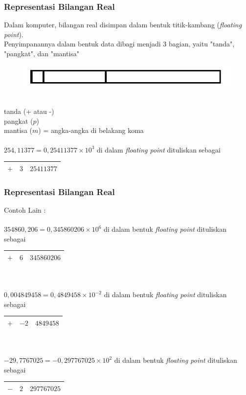 \documentclass{beamer}
\begin{document}
\begin{frame}
\frametitle{Representasi Bilangan Real}
Dalam komputer, bilangan real disimpan dalam bentuk titik-kambang (\textit{floating point}). 
\\Penyimpanannya dalam bentuk data dibagi menjadi 3 bagian, yaitu "tanda", "pangkat", dan "mantisa"
\begin{figure}[htp]
\centering
\includegraphics[scale=0.50]{float.jpg}
\end{figure}
\ \\tanda (+ atau -)
\\pangkat ($p$)
\\mantisa ($m$) = angka-angka di belakang koma 
\\\ \\$254,11377 = 0,25411377 \times 10^3$ di dalam \textit{floating point} dituliskan sebagai 
\begin{center}
\begin{tabular}{|c|c|c|}
\hline
	$+$ & $3$ & $25411377$\\
\hline
\end{tabular}
\end{center}
\end{frame}

\begin{frame}
\frametitle{Representasi Bilangan Real}
Contoh Lain :
\\\ \\$354860,206 = 0,345860206 \times 10^6$ di dalam bentuk \textit{floating point} dituliskan sebagai 
\begin{center}
\begin{tabular}{|c|c|c|}
\hline
	$+$ & $6$ & $345860206$\\
\hline
\end{tabular}
\end{center}
\ \\\ \\$0,004849458 = 0,4849458 \times 10^{-2}$ di dalam bentuk \textit{floating point} dituliskan sebagai 
\begin{center}
\begin{tabular}{|c|c|c|}
\hline
	$+$ & $-2$ & $4849458$\\
\hline
\end{tabular}
\end{center}
\ \\\ \\$-29,7767025 = -0,297767025 \times 10^{2}$ di dalam bentuk \textit{floating point} dituliskan sebagai 
\begin{center}
\begin{tabular}{|c|c|c|}
\hline
	$-$ & $2$ & $297767025$\\
\hline
\end{tabular}
\end{center}
\end{frame}
\end{document}
